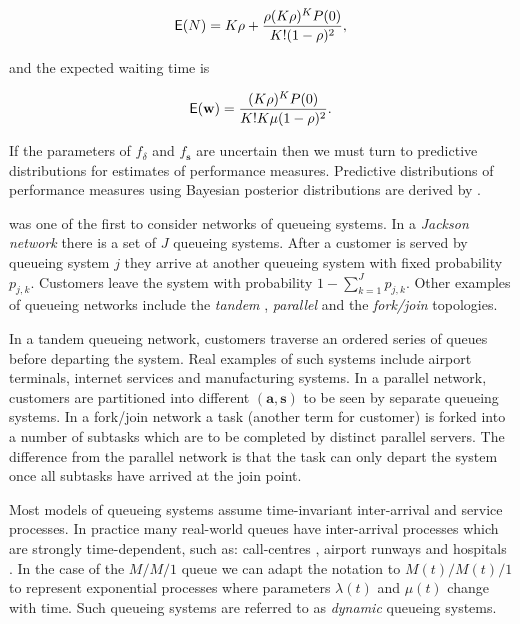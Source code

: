 \documentclass[article]{jss}
\begin{document}
\begin{align}
\mathsf{E}(N) = K\rho + \frac{\rho (K\rho)^K P(0)}{K!(1-\rho)^2},
\end{align}

and the expected waiting time is

\begin{align}
\mathsf{E}(\mathbf{w}) = \frac{(K \rho)^K P(0)}{K! K \mu(1-\rho)^2}.
\end{align}

If the parameters of $f_\delta$ and $f_{\mathbf{s}}$ are uncertain then we must turn to predictive distributions for estimates of performance measures. Predictive distributions of performance measures using Bayesian posterior distributions are derived by \citet{armero1994bayesian, armero1999dealing}.  

\citet{jackson_networks_1957} was one of the first to consider networks of queueing systems. In a \textit{Jackson network} there is a set of $J$ queueing systems. After a customer is served by queueing system $j$ they arrive at another queueing system with fixed probability $p_{j,k}$. Customers leave the system with probability $1 - \sum_{k=1}^{J} p_{j,k}$. Other examples of queueing networks include the \textit{tandem} \citep{glynn_departures_1991}, \textit{parallel} \citep{hunt_fast_1995} and the \textit{fork/join} \citep{kim_analysis_1989} topologies. 

In a tandem queueing network, customers traverse an ordered series of queues before departing the system. Real examples of such systems include airport terminals, internet services and manufacturing systems. In a parallel network, customers are partitioned into different $\mathbf{(a,s)}$ to be seen by separate queueing systems. In a fork/join network a task (another term for customer) is forked into a number of subtasks which are to be completed by distinct parallel servers. The difference from the parallel network is that the task can only depart the system once all subtasks have arrived at the join point. 

Most models of queueing systems assume time-invariant inter-arrival and service processes. In practice many real-world queues have inter-arrival processes which are strongly time-dependent, such as: call-centres \citep{weinberg2007bayesian, brown2005statistical}, airport runways \citep{koopman1972air} and hospitals \citep{brahimi_queueing_1991}. In the case of the $M/M/1$ queue we can adapt the notation to $M(t)/M(t)/1$ to represent exponential  processes where parameters $\lambda(t)$ and $\mu(t)$ change with time. Such queueing systems are referred to as \textit{dynamic} queueing systems.  
\end{document}
